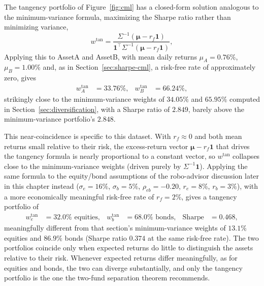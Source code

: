 \documentclass[../ai_in_finance]{subfiles}
\begin{document}
\label{sec:tangency-portfolio}

The tangency portfolio of Figure~\ref{fig:cml} has a closed-form solution analogous to the minimum-variance formula, maximizing the Sharpe ratio rather than minimizing variance,
\begin{equation}
w^{\text{tan}} = \frac{\Sigma^{-1}(\boldsymbol{\mu}-r_f\mathbf{1})}{\mathbf{1}^\top\Sigma^{-1}(\boldsymbol{\mu}-r_f\mathbf{1})},
\label{eq:portfolio-tangency}
\end{equation}
Applying this to AssetA and AssetB, with mean daily returns $\mu_A=0.76\%$, $\mu_B=1.00\%$ and, as in Section~\ref{sec:sharpe-cml}, a risk-free rate of approximately zero, gives
\begin{align*}
w_A^{\text{tan}} &= 33.76\%, & w_B^{\text{tan}} &= 66.24\%,
\end{align*}
strikingly close to the minimum-variance weights of $34.05\%$ and $65.95\%$ computed in Section~\ref{sec:diversification}, with a Sharpe ratio of $2.849$, barely above the minimum-variance portfolio's $2.848$.

This near-coincidence is specific to this dataset.
With $r_f\approx 0$ and both mean returns small relative to their risk, the excess-return vector $\boldsymbol\mu - r_f\mathbf{1}$ that drives the tangency formula is nearly proportional to a constant vector, so $w^{\text{tan}}$ collapses close to the minimum-variance weights (driven purely by $\Sigma^{-1}\mathbf{1}$). Applying the same formula to the equity/bond assumptions of the robo-advisor discussion later in this chapter instead ($\sigma_e=16\%$, $\sigma_b=5\%$, $\rho_{eb}=-0.20$, $r_e=8\%$, $r_b=3\%$), with a more economically meaningful risk-free rate of $r_f=2\%$, gives a tangency portfolio of
\begin{align*}
w_e^{\text{tan}} &= 32.0\% \text{ equities}, & w_b^{\text{tan}} &= 68.0\% \text{ bonds}, & \text{Sharpe} &= 0.468,
\end{align*}
meaningfully different from that section's minimum-variance weights of $13.1\%$ equities and $86.9\%$ bonds (Sharpe ratio $0.374$ at the same risk-free rate). The two portfolios coincide only when expected returns do little to distinguish the assets relative to their risk. Whenever expected returns differ meaningfully, as for equities and bonds, the two can diverge substantially, and only the tangency portfolio is the one the two-fund separation theorem recommends.
\end{document}
